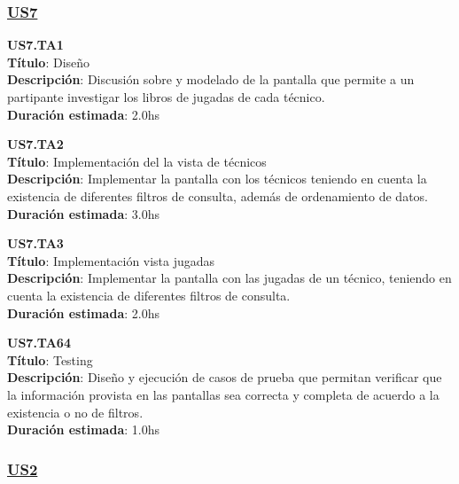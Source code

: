 \subsubsection*{\underline{US7}}

\begin{tcolorbox}
\textbf{US7.TA1} \\
\textbf{Título}: Diseño \\
\textbf{Descripción}: Discusión sobre y modelado de la pantalla que permite a un partipante investigar los libros de jugadas de cada técnico.\\
\textbf{Duración estimada}: 2.0hs
\end{tcolorbox}
\vspace{10pt}

\begin{tcolorbox}
\textbf{US7.TA2} \\
\textbf{Título}: Implementación del la vista de técnicos \\
\textbf{Descripción}: Implementar la pantalla con los técnicos teniendo en cuenta la existencia de diferentes filtros de consulta, además de ordenamiento de datos.\\
\textbf{Duración estimada}: 3.0hs
\end{tcolorbox}
\vspace{10pt}

\begin{tcolorbox}
\textbf{US7.TA3} \\
\textbf{Título}: Implementación vista jugadas \\
\textbf{Descripción}: Implementar la pantalla con las jugadas de un técnico, teniendo en cuenta la existencia de diferentes filtros de consulta.\\
\textbf{Duración estimada}: 2.0hs
\end{tcolorbox}
\vspace{10pt}

\begin{tcolorbox}
\textbf{US7.TA64} \\
\textbf{Título}: Testing \\
\textbf{Descripción}: Diseño y ejecución de casos de prueba que permitan verificar que la información provista en las pantallas sea correcta y completa de acuerdo a la existencia o no de filtros.\\
\textbf{Duración estimada}: 1.0hs
\end{tcolorbox}
\vspace{10pt}

\subsubsection*{\underline{US2}}

